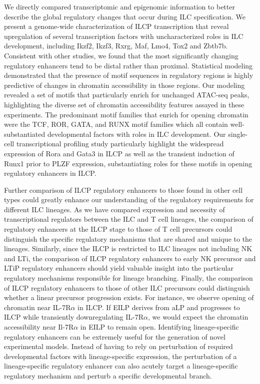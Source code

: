 We directly compared transcriptomic and epigenomic information to better describe the global regulatory changes that occur during ILC specification. We present a genome-wide characterization of ILCP transcription that reveal upregulation of several transcription factors with uncharacterized roles in ILC development, including Ikzf2, Ikzf3, Rxrg, Maf, Lmo4, Tox2 and Zbtb7b. Consistent with other studies, we found that the most significantly changing regulatory enhancers tend to be distal rather than proximal. Statistical modeling demonstrated that the presence of motif sequences in regulatory regions is highly predictive of changes in chromatin accessibility in those regions. Our modeling revealed a set of motifs that particularly enrich for unchanged ATAC-seq peaks, highlighting the diverse set of chromatin accessibility features assayed in these experiments. The predominant motif families that enrich for opening chromatin were the TCF, ROR, GATA, and RUNX motif families which all contain well-substantiated developmental factors with roles in ILC development. Our single-cell transcriptional profiling study particularly highlight the widespread expression of Rora and Gata3 in ILCP as well as the transient induction of Runx1 prior to PLZF expression, substantiating roles for these motifs in opening regulatory enhancers in ILCP. 

Further comparison of ILCP regulatory enhancers to those found in other cell types could greatly enhance our understanding of the regulatory requirements for different ILC lineages. As we have compared expression and necessity of transcriptional regulators between the ILC and T cell lineages, the comparison of regulatory enhancers at the ILCP stage to those of T cell precursors could distinguish the specific regulatory mechanisms that are shared and unique to the lineages. Similarly, since the ILCP is restricted to ILC lineages not including NK and LTi, the comparison of ILCP regulatory enhancers to early NK precursor and LTiP regulatory enhancers should yield valuable insight into the particular regulatory mechanisms responsible for lineage branching. Finally, the comparison of ILCP regulatory enhancers to those of other ILC precursors could distinguish whether a linear precursor progression exists. For instance, we observe opening of chromatin near IL-7R$\alpha$ in ILCP. If EILP derives from aLP and progresses to ILCP while transiently downregulating IL-7R$\alpha$, we would expect the chromatin accessibility near Il-7R$\alpha$ in EILP to remain open. Identifying lineage-specific regulatory enhancers can be extremely useful for the generation of novel experimental models. Instead of having to rely on perturbation of required developmental factors with lineage-specific expression, the perturbation of a lineage-specific regulatory enhancer can also acutely target a lineage-specific regulatory mechanism and perturb a specific developmental branch. 

